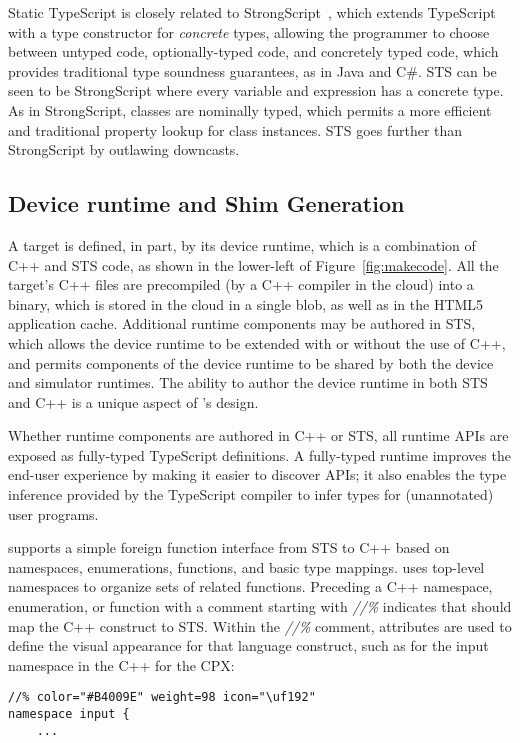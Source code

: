 Static TypeScript is closely related to  StrongScript~\cite{StrongScriptECOOP15},
which extends TypeScript with a type constructor
for \emph{concrete} types, allowing the programmer to choose between untyped
code, optionally-typed code, and concretely typed code, which provides traditional
type soundness guarantees, as in Java and C\#.
STS can be seen to be StrongScript where every variable and
expression has a concrete type. As in StrongScript, classes are nominally typed,
which permits a more efficient and traditional property lookup for class instances.
STS goes further than StrongScript by outlawing downcasts.

\subsection{Device runtime and Shim Generation}
\label{sec:shim-gen}
A \MC target is defined, in part, by its device runtime, which is a combination of C++
and STS code, as shown in the lower-left of Figure~\ref{fig:makecode}.
All the target's C++ files are precompiled (by a C++ compiler in the cloud)
into a binary, which is stored in the cloud in a single blob, as well as in the HTML5 application cache. Additional runtime
components may be authored in STS, which allows the device runtime to be extended with or without the use of C++, and permits components of the device runtime to be shared by both the device
and simulator runtimes. The ability to author the device runtime in both STS and C++ is
a unique aspect of \MCN's design.

Whether runtime components are authored in C++ or STS, all runtime APIs are exposed as fully-typed
TypeScript definitions. A fully-typed runtime improves the end-user experience
by making it easier to discover APIs; it also enables the type inference provided by the TypeScript
compiler to infer types for (unannotated) user programs.

\MC supports a simple foreign function interface from STS to C++ based on namespaces,
enumerations, functions, and basic type mappings. \MC uses top-level namespaces to organize sets of related functions.  Preceding a C++ namespace, enumeration, or function
with a comment starting with \emph{//\%} indicates that \MC should map the C++ construct to STS.
Within the \emph{//\%} comment, attributes are used to define the visual appearance for that
language construct, such as for the input namespace in the C++ for the CPX:
\begin{lstlisting}
//% color="#B4009E" weight=98 icon="\uf192"
namespace input {
    ...
\end{lstlisting}

